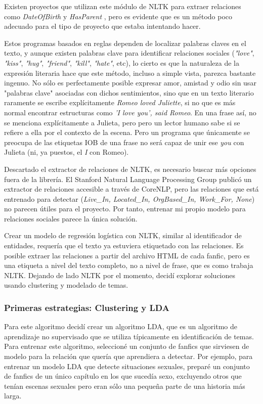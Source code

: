 \documentclass{pre-tfg}
\begin{document}
Existen proyectos que utilizan este módulo de NLTK para extraer relaciones como \textit{DateOfBirth} y \textit{HasParent} \cite{jose_2017}, pero es evidente que es un método poco adecuado para el tipo de proyecto que estaba intentando hacer.

Estos programas basados en reglas dependen de localizar palabras claves en el texto, y aunque existen palabras clave para identificar relaciones sociales (\textit{"love"}, \textit{"kiss"}, \textit{"hug"}, \textit{"friend"}, \textit{"kill"}, \textit{"hate"}, etc), lo cierto es que la naturaleza de la expresión literaria hace que este método, incluso a simple vista, parezca bastante ingenuo. No sólo es perfectamente posible expresar amor, amistad y odio sin usar "palabras clave" asociadas con dichos sentimientos, sino que en un texto literario raramente se escribe explícitamente \textit{Romeo loved Juliette}, si no que es más normal encontrar estructuras como \textit{'I love you', said Romeo}. En una frase así, no se menciona explícitamente a Julieta, pero pero un lector humano sabe si se refiere a ella por el contexto de la escena. Pero un programa que únicamente se preocupa de las etiquetas IOB de una frase no será capaz de unir ese \textit{you} con Julieta (ni, ya puestos, el \textit{I} con Romeo).

Descartado el extractor de relaciones de NLTK, es necesario buscar más opciones fuera de la librería. El Stanford Natural Language Processing Group publicó un extractor de relaciones accesible a través de CoreNLP, pero las relaciones que está entrenado para detectar (\textit{Live\_In, Located\_In, OrgBased\_In, Work\_For, None}) no parecen útiles para el proyecto. Por tanto, entrenar mi propio modelo para relaciones sociales parece la única solución.

Crear un modelo de regresión logística con NLTK, similar al identificador de entidades, requería que el texto ya estuviera etiquetado con las relaciones. Es posible extraer las relaciones a partir del archivo HTML de cada fanfic, pero es una etiqueta a nivel del texto completo, no a nivel de frase, que es como trabaja NLTK. Dejando de lado NLTK por el momento, decidí explorar soluciones usando clustering y modelado de temas.

\subsubsection{Primeras estrategias: Clustering y LDA}


Para este algoritmo decidí crear un algoritmo LDA, que es un algoritmo de aprendizaje no supervisado que se utiliza típicamente en identificación de temas. Para entrenar este algoritmo, seleccioné un conjunto de fanfics que sirviesen de modelo para la relación que quería que aprendiera a detectar. Por ejemplo, para entrenar un modelo LDA que detecte situaciones sexuales, preparé un conjunto de fanfics de un único capítulo en los que sucedía sexo, excluyendo otros que tenían escenas sexuales pero eran sólo una pequeña parte de una historia más larga. 
\end{document}
